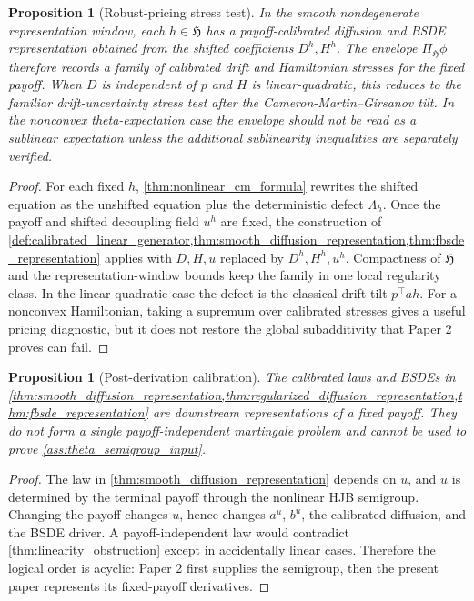 \documentclass[11pt]{amsart}
\newtheorem{proposition}[theorem]{Proposition}
\theoremstyle{definition}
\theoremstyle{remark}
\begin{document}
\begin{proposition}[Robust-pricing stress test]
\label{prop:robust_pricing_stress_test}
In the smooth nondegenerate representation window, each \(h\in\mathfrak H\)
has a payoff-calibrated diffusion and BSDE representation obtained from the
shifted coefficients \(D^h,H^h\).  The envelope
\(\Pi_{\mathfrak H}\phi\) therefore records a family of calibrated drift and
Hamiltonian stresses for the fixed payoff.  When \(D\) is independent of \(p\)
and \(H\) is linear-quadratic, this reduces to the familiar drift-uncertainty
stress test after the Cameron-Martin--Girsanov tilt.  In the nonconvex
theta-expectation case the envelope should not be read as a sublinear
expectation unless the additional sublinearity inequalities are separately
verified.
\end{proposition}

\begin{proof}
For each fixed \(h\), \cref{thm:nonlinear_cm_formula} rewrites the shifted
equation as the unshifted equation plus the deterministic defect
\(\Lambda_h\).  Once the payoff and shifted decoupling field \(u^h\) are
fixed, the construction of
\cref{def:calibrated_linear_generator,thm:smooth_diffusion_representation,thm:fbsde_representation}
applies with \(D,H,u\) replaced by \(D^h,H^h,u^h\).  Compactness of
\(\mathfrak H\) and the representation-window bounds keep the family in one
local regularity class.  In the linear-quadratic case the defect is the
classical drift tilt \(p^\top a h\).  For a nonconvex Hamiltonian, taking a
supremum over calibrated stresses gives a useful pricing diagnostic, but it
does not restore the global subadditivity that Paper 2 proves can fail.
\end{proof}

\begin{proposition}[Post-derivation calibration]
\label{prop:post_derivation_calibration}
The calibrated laws and BSDEs in
\cref{thm:smooth_diffusion_representation,thm:regularized_diffusion_representation,thm:fbsde_representation}
are downstream representations of a fixed payoff.  They do not form a single
payoff-independent martingale problem and cannot be used to prove
\cref{ass:theta_semigroup_input}.
\end{proposition}

\begin{proof}
The law in \cref{thm:smooth_diffusion_representation} depends on \(u\), and
\(u\) is determined by the terminal payoff through the nonlinear HJB semigroup.
Changing the payoff changes \(u\), hence changes \(a^u\), \(b^u\), the
calibrated diffusion, and the BSDE driver.  A payoff-independent law would
contradict \cref{thm:linearity_obstruction} except in accidentally linear
cases.  Therefore the logical order is acyclic: Paper 2 first supplies the
semigroup, then the present paper represents its fixed-payoff derivatives.
\end{proof}
\end{document}
